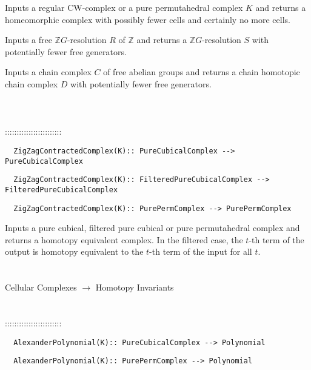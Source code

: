 \documentclass[a4paper,11pt]{report}
\begin{document}
{ 

 Inputs a regular CW-complex or a pure permutahedral complex $K$ and returns a homeomorphic complex with possibly fewer cells and certainly no
more cells. 

 Inputs a free $\mathbb ZG$-resolution $R$ of $\mathbb Z$ and returns a $\mathbb ZG$-resolution $S$ with potentially fewer free generators. 

 Inputs a chain complex $C$ of free abelian groups and returns a chain homotopic chain complex $D$ with potentially fewer free generators. \\
 \\
 \\
 \\
 ::::::::::::::::::::::::\\
 
\begin{verbatim}  ZigZagContractedComplex(K):: PureCubicalComplex --> PureCubicalComplex
\end{verbatim}
 
\begin{verbatim}  ZigZagContractedComplex(K):: FilteredPureCubicalComplex --> FilteredPureCubicalComplex
\end{verbatim}
 
\begin{verbatim}  ZigZagContractedComplex(K):: PurePermComplex --> PurePermComplex
\end{verbatim}
 

 Inputs a pure cubical, filtered pure cubical or pure permutahedral complex and
returns a homotopy equivalent complex. In the filtered case, the $t$-th term of the output is homotopy equivalent to the $t$-th term of the input for all $t$. \\
 \\
 \\
 Cellular Complexes $\longrightarrow$ Homotopy Invariants \\
 \\
 \\
 ::::::::::::::::::::::::\\
 
\begin{verbatim}  AlexanderPolynomial(K):: PureCubicalComplex --> Polynomial
\end{verbatim}
 
\begin{verbatim}  AlexanderPolynomial(K):: PurePermComplex --> Polynomial
\end{verbatim}
 
}
\end{document}
